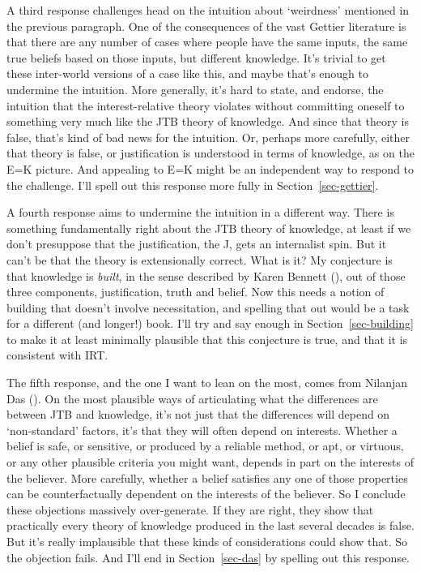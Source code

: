 \documentclass[
  12pt,
  letterpaper,
]{scrbook}
\begin{document}
A third response challenges head on the intuition about `weirdness'
mentioned in the previous paragraph. One of the consequences of the vast
Gettier literature is that there are any number of cases where people
have the same inputs, the same true beliefs based on those inputs, but
different knowledge. It's trivial to get these inter-world versions of a
case like this, and maybe that's enough to undermine the intuition. More
generally, it's hard to state, and endorse, the intuition that the
interest-relative theory violates without committing oneself to
something very much like the JTB theory of knowledge. And since that
theory is false, that's kind of bad news for the intuition. Or, perhaps
more carefully, either that theory is false, or justification is
understood in terms of knowledge, as on the E=K picture. And appealing
to E=K might be an independent way to respond to the challenge. I'll
spell out this response more fully in Section~\ref{sec-gettier}.

A fourth response aims to undermine the intuition in a different way.
There is something fundamentally right about the JTB theory of
knowledge, at least if we don't presuppose that the justification, the
J, gets an internalist spin. But it can't be that the theory is
extensionally correct. What is it? My conjecture is that knowledge is
\emph{built}, in the sense described by Karen Bennett
(), out of those three components,
justification, truth and belief. Now this needs a notion of building
that doesn't involve necessitation, and spelling that out would be a
task for a different (and longer!) book. I'll try and say enough in
Section~\ref{sec-building} to make it at least minimally plausible that
this conjecture is true, and that it is consistent with IRT.

The fifth response, and the one I want to lean on the most, comes from
Nilanjan Das (). On the most plausible
ways of articulating what the differences are between JTB and knowledge,
it's not just that the differences will depend on `non-standard'
factors, it's that they will often depend on interests. Whether a belief
is safe, or sensitive, or produced by a reliable method, or apt, or
virtuous, or any other plausible criteria you might want, depends in
part on the interests of the believer. More carefully, whether a belief
satisfies any one of those properties can be counterfactually dependent
on the interests of the believer. So I conclude these objections
massively over-generate. If they are right, they show that practically
every theory of knowledge produced in the last several decades is false.
But it's really implausible that these kinds of considerations could
show that. So the objection fails. And I'll end in Section~\ref{sec-das}
by spelling out this response.
\end{document}
